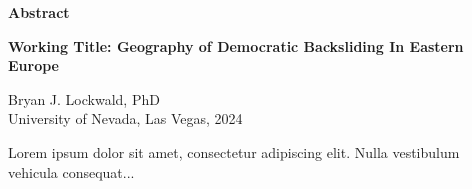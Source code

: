 
\setcounter{page}{3}
\pagestyle{plain}

\begin{center}
    {\large \textbf{Abstract}} %
    
    \vspace{1\baselineskip}

    \begin{singlespace}
        \textbf{Working Title: Geography of Democratic Backsliding In Eastern Europe}
    \end{singlespace}
    
    \vspace{1\baselineskip}

    Bryan J. Lockwald, PhD\\
    University of Nevada, Las Vegas, 2024\\
\end{center}

\vspace*{1\baselineskip}

\begin{doublespace}
    Lorem ipsum dolor sit amet, consectetur adipiscing elit. Nulla vestibulum vehicula consequat...
\end{doublespace}
